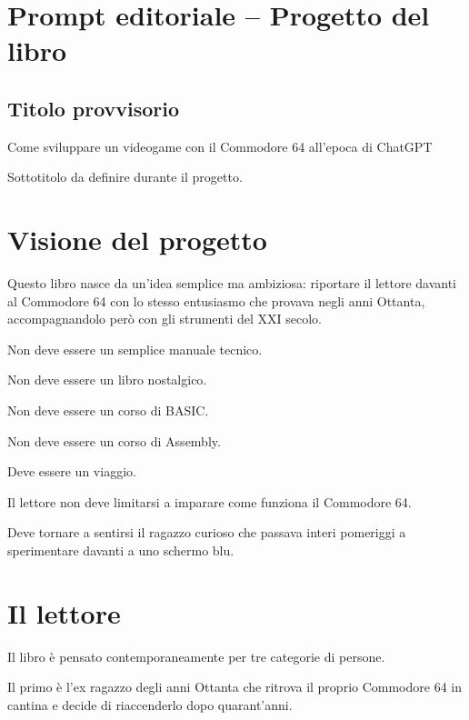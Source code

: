 \documentclass{article}
\author{HP}
\date{2026-07-26}
\begin{document}
\section{Prompt editoriale – Progetto del libro}
\subsection{Titolo provvisorio}
Come sviluppare un videogame con il Commodore 64 all'epoca di ChatGPT

Sottotitolo da definire durante il progetto.



\section{Visione del progetto}
Questo libro nasce da un'idea semplice ma ambiziosa: riportare il lettore davanti al Commodore 64 con lo stesso
entusiasmo che provava negli anni Ottanta, accompagnandolo però con gli strumenti del XXI secolo.

Non deve essere un semplice manuale tecnico.

Non deve essere un libro nostalgico.

Non deve essere un corso di BASIC.

Non deve essere un corso di Assembly.

Deve essere un viaggio.

Il lettore non deve limitarsi a imparare come funziona il Commodore 64.

Deve tornare a sentirsi il ragazzo curioso che passava interi pomeriggi a sperimentare davanti a uno schermo blu.



\section{Il lettore}
Il libro è pensato contemporaneamente per tre categorie di persone.

Il primo è l'ex ragazzo degli anni Ottanta che ritrova il proprio Commodore 64 in cantina e decide di riaccenderlo dopo
quarant'anni.
\end{document}

